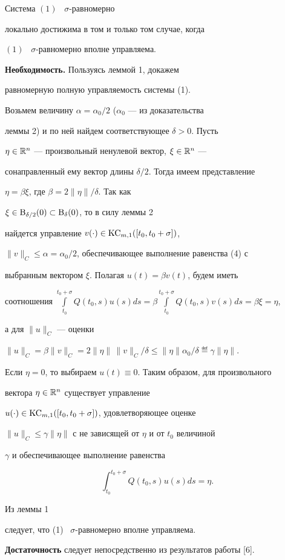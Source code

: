 \begin{thm}


Система $(1)$ \ $\sigma$-равномерно


локально достижима в том и только том случае, когда


$(1)$ \ $\sigma$-равномерно вполне управляема.


\end{thm}





\begin{pf}


{\bf Необходимость.} Пользуясь леммой 1, докажем


равномерную полную управляемость системы (1).


Возьмем величину $\alpha=\alpha_0/2$ ($\alpha_0$ --- из доказательства


леммы 2) и по ней найдем соответствующее $\delta>0$. Пусть


$\eta\in\Bbb R^n$ --- произвольный ненулевой вектор, $\xi\in\Bbb R^n$ ---


сонаправленный ему вектор длины $\delta/2$. Тогда имеем представление


$\eta=\beta\xi$, где $\beta=2\|\eta\|/\delta$. Так как


$\xi\in\mathrm B_{\delta/2}(0)\subset\mathrm B_{\delta}(0)$, то в силу леммы 2


найдется управление $v(\cdot)\in\mathrm{KC}_{m,1}([t_0,t_0+\sigma])$,


$\|v\|_C\le\alpha=\alpha_0/2$, обеспечивающее выполнение равенства (4) с


выбранным вектором $\xi$. Полагая $u(t)=\beta v(t)$, будем иметь


соотношения $\int\limits_{t_0}^{t_0+\sigma}Q(t_0,s)u(s)ds=


\beta\int\limits_{t_0}^{t_0+\sigma}Q(t_0,s)v(s)ds=\beta\xi= \eta$,


а для $\|u\|_C$ --- оценки


$\|u\|_C=\beta\|v\|_C=2\|\eta\|\,\|v\|_C/\delta\le


\|\eta\|\alpha_0/\delta\eqdef\gamma\|\eta\|$.


Если $\eta=0$, то выбираем $u(t)\equiv 0$. Таким образом, для произвольного


вектора $\eta\in\Bbb R^n$ существует управление


$u(\cdot)\in\mathrm{KC}_{m,1}([t_0,t_0+\sigma])$, удовлетворяющее оценке


$\|u\|_C\le\gamma\|\eta\|$ с не зависящей от $\eta$ и от $t_0$ величиной


$\gamma$ и обеспечивающее выполнение равенства


$$


\int_{t_0}^{t_0+\sigma}Q(t_0,s)u(s)ds=\eta.


$$


Из леммы 1


следует, что (1) \ $\sigma$-равномерно вполне управляема.





{\bf Достаточность} следует непосредственно из результатов работы [6].


\end{pf}
